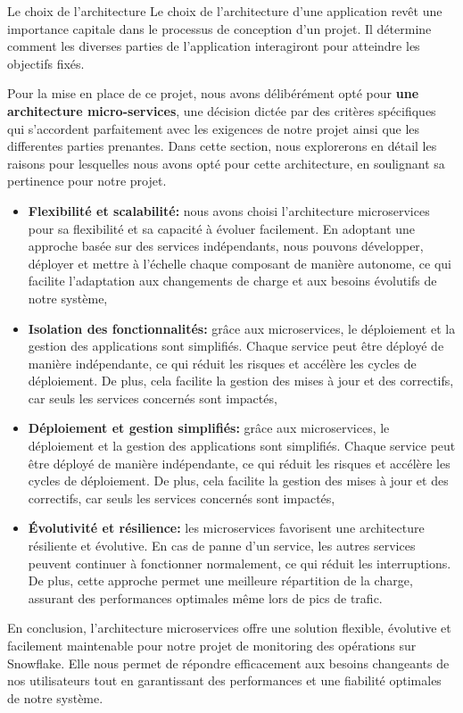 \par Le choix de l'architecture Le choix de l'architecture d'une application revêt une importance capitale dans le processus de conception d'un projet. 
Il détermine comment les diverses parties de l'application interagiront pour atteindre les objectifs fixés.
\par Pour la mise en place de ce projet, nous avons délibérément opté pour \textbf{une architecture micro-services}, une décision dictée par des critères spécifiques qui s'accordent parfaitement avec les exigences de notre projet ainsi que les differentes parties prenantes.
Dans cette section, nous explorerons en détail les raisons pour lesquelles nous avons opté pour cette architecture, en soulignant sa pertinence pour notre projet.
\begin{itemize}
        \item \textbf{Flexibilité et scalabilité: } nous avons choisi l'architecture microservices pour sa flexibilité et sa capacité à évoluer facilement. 
        En adoptant une approche basée sur des services indépendants, nous pouvons développer, déployer et mettre à l'échelle chaque composant de manière autonome, 
        ce qui facilite l'adaptation aux changements de charge et aux besoins évolutifs de notre système,
        \item \textbf{Isolation des fonctionnalités: } grâce aux microservices, le déploiement et la gestion des applications sont simplifiés. Chaque service peut être déployé de manière indépendante, ce qui réduit les risques et accélère les cycles de déploiement.
         De plus, cela facilite la gestion des mises à jour et des correctifs, car seuls les services concernés sont impactés,
        \item \textbf{Déploiement et gestion simplifiés:} grâce aux microservices, le déploiement et la gestion des applications sont simplifiés. Chaque service peut être déployé de manière indépendante, ce qui réduit les risques et accélère les cycles de déploiement.
         De plus, cela facilite la gestion des mises à jour et des correctifs, car seuls les services concernés sont impactés,
         \item \textbf{Évolutivité et résilience:} les microservices favorisent une architecture résiliente et évolutive. 
         En cas de panne d'un service, les autres services peuvent continuer à fonctionner normalement, ce qui réduit les interruptions.
         De plus, cette approche permet une meilleure répartition de la charge, assurant des performances optimales même lors de pics de trafic.
\end{itemize}
\par En conclusion, l'architecture microservices offre une solution flexible, évolutive et facilement maintenable pour notre projet de monitoring des opérations sur Snowflake.
Elle nous permet de répondre efficacement aux besoins changeants de nos utilisateurs tout en garantissant des performances et une fiabilité optimales de notre système.
